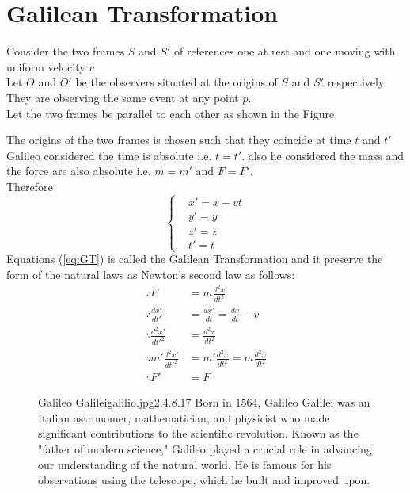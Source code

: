 \newpage
\section{Galilean Transformation}
Consider the two frames $S$ and $S'$ of references one at rest and one moving with uniform velocity $v$\\
Let $O$ and $O'$ be the observers situated at the origins of $S$ and $S'$ respectively.\\
They are observing the same event at any point $p$.\\
Let the two frames be parallel to each other as shown in the Figure
\begin{Framesofreference}
\end{Framesofreference}
The origins of the two frames is chosen such that they coincide at time $t$ and $t'$\\
Galileo considered the time is absolute i.e. $t = t'$.
 also he considered the mass and the force are also absolute i.e. $m = m'$ and $F = F'$.\\
Therefore
\begin{equation}
    \label{eq:GT}
    \begin{cases}
    &x' = x-vt\\
    &y' =y\\
    &z' =z\\
    &t' =t
\end{cases}    
\end{equation}
Equations (\ref{eq:GT}) is called the Galilean Transformation and it preserve the form of the natural laws as Newton's second law as follows:
\begin{align*}
    \because F &= m\frac{d^2x}{dt^2}\\
    \because  \frac{dx'}{dt'} &= \frac{dx'}{dt} = \frac{dx}{dt} - v\\ 
    \therefore \frac{d^2x'}{d{t'}^2} &= \frac{d^2x}{dt^2}\\
    \therefore m'\frac{d^2x'}{d{t'}^2} &= m'\frac{d^2x}{dt^2} = m\frac{d^2x}{dt^2}\\
    \therefore F' &= F
\end{align*}

\begin{figure}[b]
    \begin{enrichment}{Galileo Galilei}{galilio.jpg}{2.4}{.8}{.17}
        Born in 1564, Galileo Galilei was an Italian astronomer, mathematician, and physicist who made significant contributions to the scientific revolution. 
        Known as the "father of modern science," Galileo played a crucial role in advancing our understanding of the natural world. 
        He is famous for his observations using the telescope, which he built and improved upon.
    \end{enrichment}
\end{figure}

